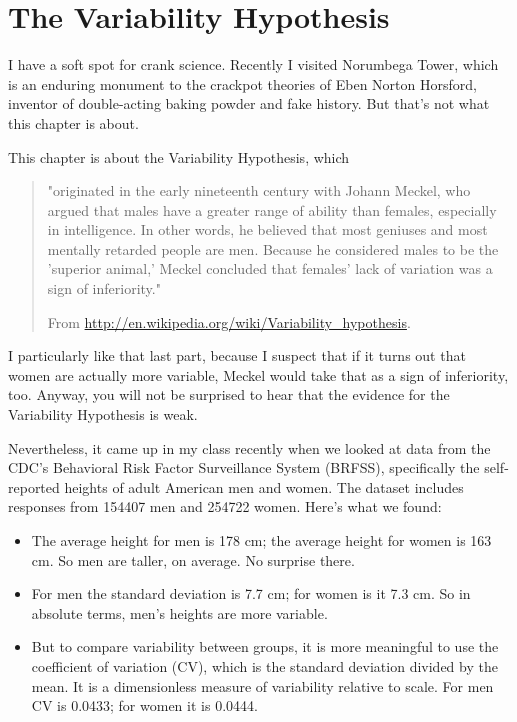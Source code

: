 \documentclass[12pt]{book}
\begin{document}
\section{The Variability Hypothesis}

I have a soft spot for crank science.  Recently I visited Norumbega
Tower, which is an enduring monument to the crackpot theories of Eben
Norton Horsford, inventor of double-acting baking powder and fake
history.  But that's not what this chapter is about.

This chapter is about the Variability Hypothesis, which

\begin{quote}
"originated in the early nineteenth century with Johann Meckel, who
  argued that males have a greater range of ability than females,
  especially in intelligence. In other words, he believed that most
  geniuses and most mentally retarded people are men. Because he
  considered males to be the 'superior animal,' Meckel concluded that
  females' lack of variation was a sign of inferiority."

From \url{http://en.wikipedia.org/wiki/Variability_hypothesis}.
\end{quote}

I particularly like that last part, because I suspect that if it turns
out that women are actually more variable, Meckel would take that as a
sign of inferiority, too.  Anyway, you will not be surprised to hear
that the evidence for the Variability Hypothesis is weak.

Nevertheless, it came up in my class recently when we looked at data
from the CDC's Behavioral Risk Factor Surveillance System (BRFSS),
specifically the self-reported heights of adult American men and women.
The dataset includes responses from 154407 men and 254722 women.
Here's what we found:

\begin{itemize}

\item The average height for men is 178 cm; the average height for
  women is 163 cm.  So men are taller, on average.  No surprise there.

\item For men the standard deviation is 7.7 cm; for women is it 7.3
  cm.  So in absolute terms, men's heights are more variable.

\item But to compare variability between groups, it is more meaningful
  to use the coefficient of variation (CV), which is the standard
  deviation divided by the mean.  It is a dimensionless measure of
  variability relative to scale.  For men CV is 0.0433; for women it
  is 0.0444.

\end{itemize}
\end{document}

